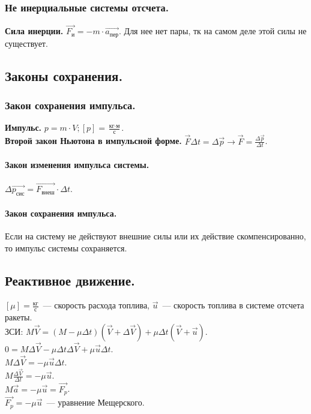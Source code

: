 \documentclass{article}
\begin{document}
	\subsubsection{Не инерциальные системы отсчета.}
	\textbf{Сила инерции.} $\vec{F_{\text{и}}} = -m \cdot \vec{a_{\text{пер}}}$. Для нее нет пары, тк на самом деле этой силы не существует.
	\subsection{Законы сохранения.}
	\subsubsection{Закон сохранения импульса.}
	\textbf{Импульс.} $p = m \cdot V; [p] = \frac{\text{кг} \cdot \text{м}}{\text{с}}$. \\
	\textbf{Второй закон Ньютона в импульсной форме.} $\vec{F} \varDelta t = \varDelta \vec{p} \rightarrow \vec{F} = \frac{\varDelta \vec{p}}{\varDelta t}$. \\
	\paragraph{Закон изменения импульса системы.} $\varDelta \vec{p_{\text{сис}}} = \vec{F_{\text{внеш}}} \cdot \varDelta t$.
	\paragraph{Закон сохранения импульса.} Если на систему не действуют внешние силы или их действие скомпенсированно, то импульс системы сохраняется.
	\subsection{Реактивное движение.}
	$[\mu] = \frac{\text{кг}}{\text{с}}$~--- скорость расхода топлива, $\vec{u}$~--- скорость топлива в системе отсчета ракеты. \\
	ЗСИ: $M \vec{V} = (M - \mu \varDelta t)(\vec{V} + \varDelta \vec{V}) + \mu \varDelta t (\vec{V} + \vec{u})$. \\
	$0 = M \varDelta \vec{V} - \mu \varDelta t \varDelta \vec{V} + \mu \vec{u} \varDelta t$. \\
	$M \varDelta \vec{V} = -\mu \vec{u} \varDelta t$. \\
	$M \frac{\varDelta \vec{V}}{\varDelta t} = -\mu \vec{u}$. \\
	$M \vec{a} = - \mu \vec{u} = \vec{F_{p}}$. \\
	$\vec{F_{p}} = -\mu \vec{u}$~--- уравнение Мещерского.
\end{document}
